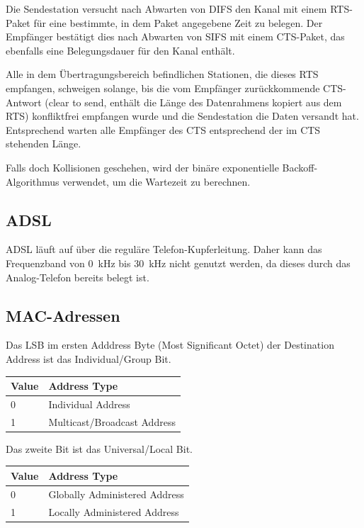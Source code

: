 Die Sendestation versucht nach Abwarten von DIFS den Kanal mit einem RTS-Paket
für eine bestimmte, in dem Paket angegebene Zeit zu belegen. Der Empfänger
bestätigt dies nach Abwarten von SIFS mit einem CTS-Paket, das ebenfalls eine
Belegungsdauer für den Kanal enthält.

Alle in dem Übertragungsbereich befindlichen Stationen, die dieses RTS
empfangen, schweigen solange, bis die vom Empfänger zurückkommende CTS-Antwort
(clear to send, enthält die Länge des Datenrahmens kopiert aus dem RTS)
konfliktfrei empfangen wurde und die Sendestation die Daten versandt hat.
Entsprechend warten alle Empfänger des CTS entsprechend der im CTS stehenden
Länge.

Falls doch Kollisionen geschehen, wird der binäre exponentielle
Backoff-Algorithmus verwendet, um die Wartezeit zu berechnen.


\subsection{ADSL}

ADSL läuft auf über die reguläre Telefon-Kupferleitung. Daher kann das
Frequenzband von 0~kHz bis 30~kHz nicht genutzt werden, da dieses durch das
Analog-Telefon bereits belegt ist.


\subsection{MAC-Adressen}

Das LSB im ersten Adddress Byte (Most Significant Octet) der Destination Address
ist das Individual/Group Bit.

\begin{tabular}[h]{|l|l|}
	\hline
  \textbf{Value} & \textbf{Address Type} \\
	\hline
  0 & Individual Address \\
  1 & Multicast/Broadcast Address \\
	\hline
\end{tabular}

Das zweite Bit ist das Universal/Local Bit.

\begin{tabular}[h]{|l|l|}
	\hline
  \textbf{Value} & \textbf{Address Type} \\
	\hline
  0 & Globally Administered Address \\
  1 & Locally Administered Address \\
	\hline
\end{tabular}
